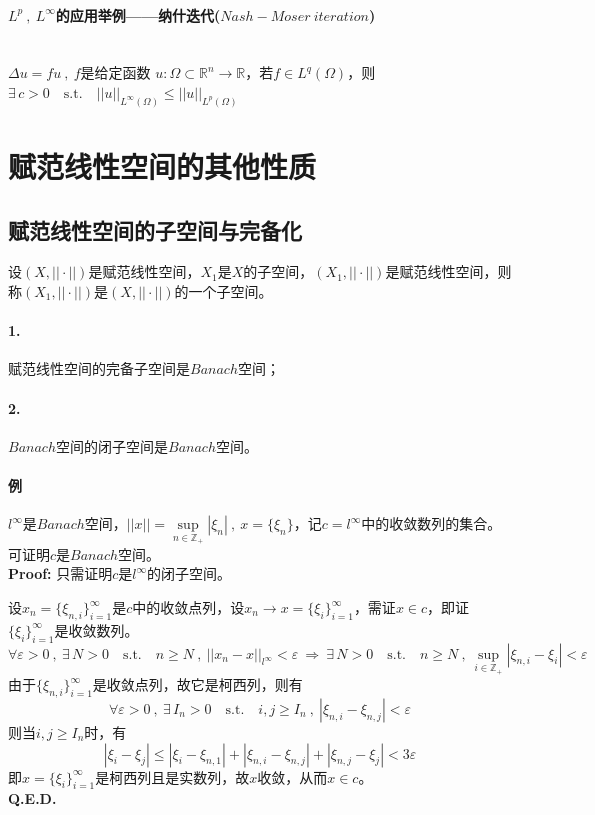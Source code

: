 \paragraph*{$L^p \ , \ L^{\infty}$的应用举例——纳什迭代($Nash-Moser \ iteration$)} \quad \\
$\Delta u=fu \ , \ f$是给定函数 $u:\Omega \subset \mathbb{R}^n \to \mathbb{R}$，若$f \in L^q(\Omega)$，则$\exists \, c>0 \quad \text{s.t.} \quad ||u||_{L^{\infty}(\Omega)} \leq ||u||_{L^p(\Omega)}$

\section{赋范线性空间的其他性质}
\subsection{赋范线性空间的子空间与完备化}
设$(X,||\cdot||)$是赋范线性空间，$X_1$是$X$的子空间，$(X_1,||\cdot||)$是赋范线性空间，则称$(X_1,||\cdot||)$是$(X,||\cdot||)$的一个子空间。
\begin{theorem}
    \paragraph*{1.} 赋范线性空间的完备子空间是$Banach$空间；
    \paragraph*{2.} $Banach$空间的闭子空间是$Banach$空间。
\end{theorem}
\paragraph*{例} $l^{\infty}$是$Banach$空间，$||x||=\mathop \text{sup}\limits_{n \in \mathbb{Z}_+}|\xi_n| \ , \ x=\{\xi_n\}$，记$c=l^{\infty}$中的收敛数列的集合。可证明$c$是$Banach$空间。\\
\textbf{Proof:} 只需证明$c$是$l^{\infty}$的闭子空间。

设$x_n=\{\xi_{n,i}\}_{i=1}^{\infty}$是$c$中的收敛点列，设$x_n \to x=\{\xi_i\}_{i=1}^{\infty}$，需证$x \in c$，即证$\{\xi_i\}_{i=1}^{\infty}$是收敛数列。
\[\forall \varepsilon>0 \ , \ \exists \, N>0 \quad \text{s.t.} \quad n \geq N \ , \ ||x_n-x||_{l^{\infty}}<\varepsilon \ \Rightarrow \ \exists \, N>0 \quad \text{s.t.} \quad n \geq N \ , \ \mathop \text{sup}\limits_{i \in \mathbb{Z}_+}|\xi_{n,i}-\xi_i|<\varepsilon\]
由于$\{\xi_{n,i}\}_{i=1}^{\infty}$是收敛点列，故它是柯西列，则有
\[\forall \varepsilon>0 \ , \ \exists \, I_n>0 \quad \text{s.t.} \quad i,j \geq I_n \ , \ |\xi_{n,i}-\xi_{n,j}|<\varepsilon\]
则当$i,j \geq I_n$时，有
\[|\xi_{i}-\xi_{j}| \leq |\xi_{i}-\xi_{n,1}|+|\xi_{n,i}-\xi_{n,j}|+|\xi_{n,j}-\xi_{j}|<3\varepsilon\]
即$x=\{\xi_i\}_{i=1}^{\infty}$是柯西列且是实数列，故$x$收敛，从而$x \in c$。\\
\textbf{Q.E.D.}

